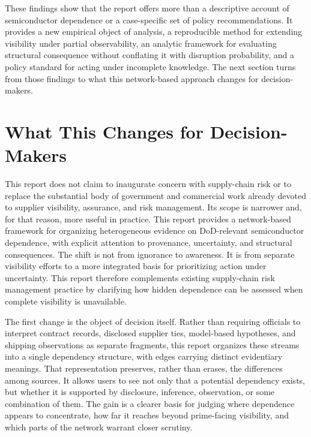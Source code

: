 These findings show that the report offers more than a descriptive account of semiconductor dependence or a case-specific set of policy recommendations. It provides a new empirical object of analysis, a reproducible method for extending visibility under partial observability, an analytic framework for evaluating structural consequence without conflating it with disruption probability, and a policy standard for acting under incomplete knowledge. The next section turns from those findings to what this network-based approach changes for decision-makers.

\section{What This Changes for Decision-Makers}
\label{sec:ch6_what_changes_for_decision_making}

This report does not claim to inaugurate concern with supply-chain risk or to replace the substantial body of government and commercial work already devoted to supplier visibility, assurance, and risk management. Its scope is narrower and, for that reason, more useful in practice. This report provides a network-based framework for organizing heterogeneous evidence on DoD-relevant semiconductor dependence, with explicit attention to provenance, uncertainty, and structural consequences. The shift is not from ignorance to awareness. It is from separate visibility efforts to a more integrated basis for prioritizing action under uncertainty. This report therefore complements existing supply-chain risk management practice by clarifying how hidden dependence can be assessed when complete visibility is unavailable.

The first change is the object of decision itself. Rather than requiring officials to interpret contract records, disclosed supplier ties, model-based hypotheses, and shipping observations as separate fragments, this report organizes these streams into a single dependency structure, with edges carrying distinct evidentiary meanings. That representation preserves, rather than erases, the differences among sources. It allows users to see not only that a potential dependency exists, but whether it is supported by disclosure, inference, observation, or some combination of them. The gain is a clearer basis for judging where dependence appears to concentrate, how far it reaches beyond prime-facing visibility, and which parts of the network warrant closer scrutiny.

